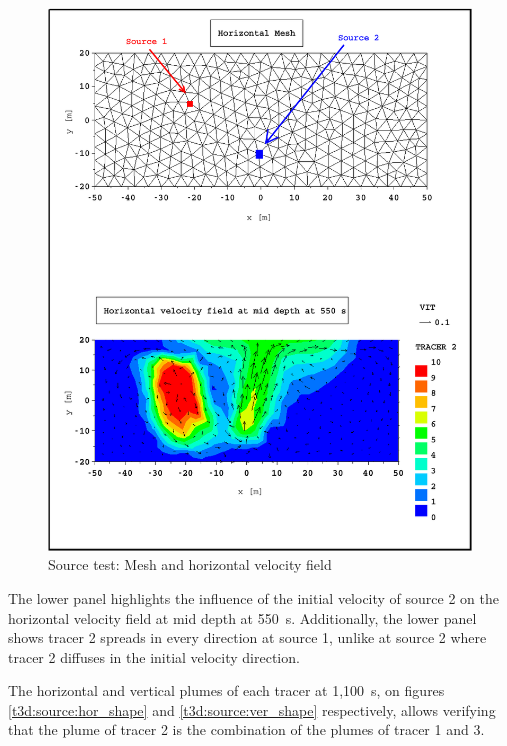 \begin{figure} [H]
\centering
\includegraphics[scale=1.]{../img/source_mesh_vit.pdf}
 \caption{Source test: Mesh and horizontal velocity field}
 \label{t3d:source:mesh_vel}
\end{figure}

The lower panel highlights the influence of the initial velocity of
source 2 on the horizontal velocity field at mid depth at 550~s.
Additionally, the lower panel shows tracer 2 spreads in every direction
at source 1, unlike at source 2 where tracer 2 diffuses in the initial
velocity direction.

The horizontal and vertical plumes of each tracer at 1,100~s, on
figures \ref{t3d:source:hor_shape} and \ref{t3d:source:ver_shape}
respectively, allows verifying that the plume of tracer 2 is the
combination of the plumes of tracer 1 and 3.


